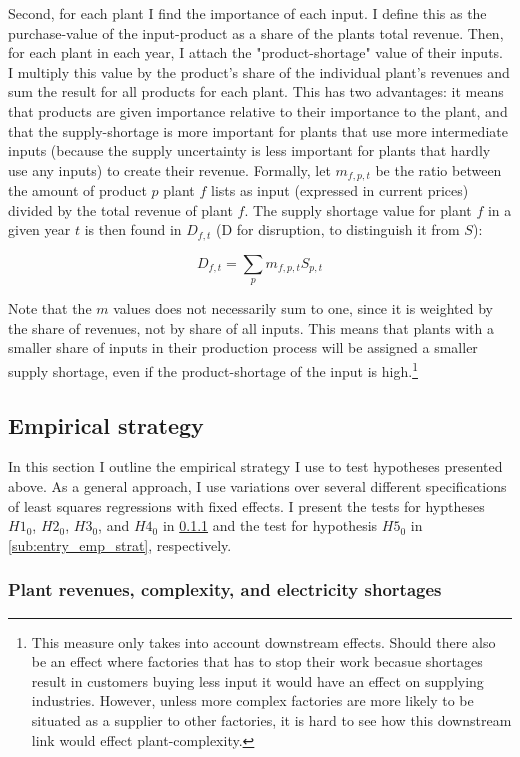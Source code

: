 \documentclass[11pt]{article}
\begin{document}
Second, for each plant I find the importance of each input. I define this as the purchase-value of the input-product as a share of the plants total revenue. Then, for each plant in each year, I attach the "product-shortage" value of their inputs. I multiply this value by the product's share of the individual plant's revenues and sum the result for all products for each plant. This has two advantages: it means that products are given importance relative to their importance to the plant, and that the supply-shortage is more important for plants that use more intermediate inputs (because the supply uncertainty is less important for plants that hardly use any inputs) to create their revenue. Formally, let $m_{f,p,t}$ be the ratio between the amount of product $p$ plant $f$ lists as input (expressed in current prices) divided by the total revenue of plant $f$. The supply shortage value for plant $f$ in a given year $t$ is then found in $D_{f,t}$ (D for disruption, to distinguish it from $S$):

\[
D_{f,t} = \sum_p m_{f,p,t} S_{p,t}
\]

Note that the $m$ values does not necessarily sum to one, since it is weighted by the share of revenues, not by share of all inputs. This means that plants with a smaller share of inputs in their production process will be assigned a smaller supply shortage, even if the product-shortage of the input is high.\footnote{This measure only takes into account downstream effects. Should there also be an effect where factories that has to stop their work becasue shortages result in customers buying less input it would have an effect on supplying industries. However, unless more complex factories are more likely to be situated as a supplier to other factories, it is hard to see how this downstream link would effect plant-complexity.}

\subsection{Empirical strategy}
\label{sec:emp_strat}

In this section I outline the empirical strategy I use to test hypotheses presented above. As a general approach, I use variations over several different specifications of least squares regressions with fixed effects. I present the tests for hyptheses $H1_0$, $H2_0$, $H3_0$, and $H4_0$ in \ref{sub:interaction_emp_strat} and the test for hypothesis $H5_0$ in \ref{sub:entry_emp_strat}, respectively.

\subsubsection{Plant revenues, complexity, and electricity shortages}\label{sub:interaction_emp_strat}
\end{document}

